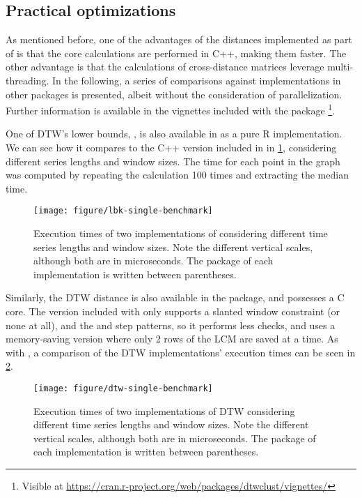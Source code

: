 \subsection{Practical optimizations}
\label{sec:minibench}

As mentioned before,
one of the advantages of the distances implemented as part of \dtwclust{} is that the core calculations are performed in C++,
making them faster.
The other advantage is that the calculations of cross-distance matrices leverage multi-threading.
In the following,
a series of comparisons against implementations in other packages is presented,
albeit without the consideration of parallelization.
Further information is available in the vignettes included with the package%
\footnote{Visible at \url{https://cran.r-project.org/web/packages/dtwclust/vignettes/}}.

One of DTW's lower bounds,
,
is also available in  as a pure R implementation.
We can see how it compares to the C++ version included in \dtwclust{} in \cref{fig:lbk-single-benchmark},
considering different series lengths and window sizes.
The time for each point in the graph was computed by repeating the calculation 100 times and extracting the median time.

\begin{figure}[htbp]
	
	{\centering \texttt{[image: figure/lbk-single-benchmark]}
		
	}
	
	\caption{Execution times of two implementations of  considering different time series lengths and window sizes. Note the different vertical scales, although both are in microseconds. The package of each implementation is written between parentheses.}\label{fig:lbk-single-benchmark}
\end{figure}

Similarly, the DTW distance is also available in the  package,
and possesses a C core.
The  version included with \dtwclust{} only supports a slanted window constraint
(or none at all),
and the  and  step patterns,
so it performs less checks,
and uses a memory-saving version where only 2 rows of the LCM are saved at a time.
As with ,
a comparison of the DTW implementations' execution times can be seen in \cref{fig:dtw-single-benchmark}.

\begin{figure}[htbp]
	
	{\centering \texttt{[image: figure/dtw-single-benchmark]}
		
	}
	
	\caption{Execution times of two implementations of DTW considering different time series lengths and window sizes. Note the different vertical scales, although both are in microseconds. The package of each implementation is written between parentheses.}\label{fig:dtw-single-benchmark}
\end{figure}

